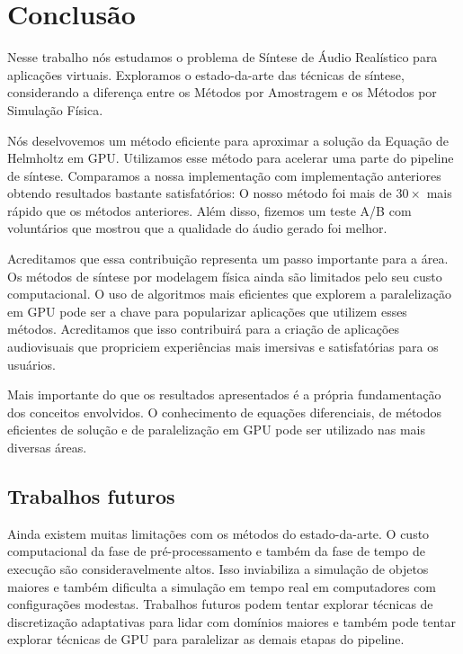 \chapter{Conclusão}

Nesse trabalho nós estudamos o problema de Síntese de Áudio Realístico para aplicações virtuais. Exploramos o estado-da-arte das técnicas de síntese, considerando a diferença entre os Métodos por Amostragem e os Métodos por Simulação Física.

Nós deselvovemos um método eficiente para aproximar a solução da Equação de Helmholtz em GPU. Utilizamos esse método para acelerar uma parte do pipeline de síntese. Comparamos a nossa implementação com implementação anteriores obtendo resultados bastante satisfatórios: O nosso método foi mais de $30\times$ mais rápido que os métodos anteriores. Além disso, fizemos um teste A/B com voluntários que mostrou que a qualidade do áudio gerado foi melhor.

Acreditamos que essa contribuição representa um passo importante para a área. Os métodos de síntese por modelagem física ainda são limitados pelo seu custo computacional. O uso de algoritmos mais eficientes que explorem a paralelização em GPU pode ser a chave para popularizar aplicações que utilizem esses métodos. Acreditamos que isso contribuirá para a criação de aplicações audiovisuais que propriciem experiências mais imersivas e satisfatórias para os usuários.

Mais importante do que os resultados apresentados é a própria fundamentação dos conceitos envolvidos. O conhecimento de equações diferenciais, de métodos eficientes de solução e de paralelização em GPU pode ser utilizado nas mais diversas áreas.

\section{Trabalhos futuros}

Ainda existem muitas limitações com os métodos do estado-da-arte. O custo computacional da fase de pré-processamento e também da fase de tempo de execução são consideravelmente altos. Isso inviabiliza a simulação de objetos maiores e também dificulta a simulação em tempo real em computadores com configurações modestas. Trabalhos futuros podem tentar explorar técnicas de discretização adaptativas para lidar com domínios maiores e também pode tentar explorar técnicas de GPU para paralelizar as demais etapas do pipeline.